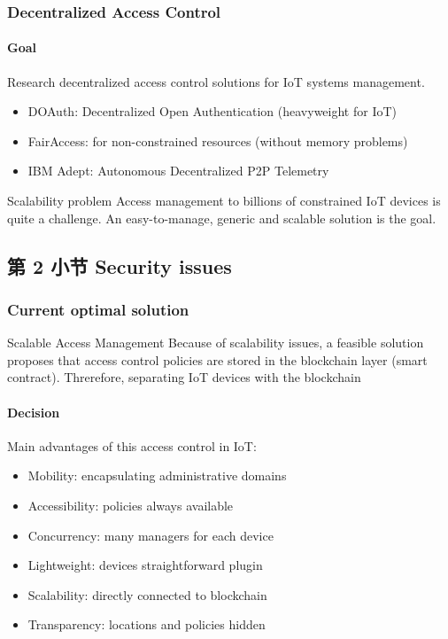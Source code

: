 \documentclass[
    aspectratio=169,                   %
]{beamer}
\begin{document}
    \begin{frame}
        \frametitle{Decentralized Access Control}
        
        \paragraph{Goal} Research decentralized access control solutions for IoT systems management.\cite{ouaddah}

        \begin{itemize}
            \item \alert{DOAuth}: Decentralized Open Authentication (heavyweight for IoT)
            \item \alert{FairAccess}: for non-constrained resources (without memory problems)
            \item \alert{IBM Adept}: Autonomous Decentralized P2P Telemetry
        \end{itemize}

        \begin{block}{Scalability problem}
            Access management to billions of constrained IoT devices is quite a challenge. An easy-to-manage, generic and scalable solution is the goal.
        \end{block}
    \end{frame}

\subsection{第 2 小节 Security issues}

    \begin{frame}
        \frametitle{Current optimal solution}
        
        \begin{block}{Scalable Access Management}
            Because of scalability issues, a feasible solution proposes that access control policies are stored in the blockchain layer (smart contract). Threrefore, separating IoT devices with the blockchain\cite{novo}
        \end{block}

        \paragraph{Decision} Main advantages of this access control in IoT:

        \begin{itemize}
            \item \alert{Mobility}: encapsulating administrative domains
            \item \alert{Accessibility}: policies always available
            \item \alert{Concurrency}: many managers for each device
            \item \alert{Lightweight}: devices straightforward plugin
            \item \alert{Scalability}: directly connected to blockchain
            \item \alert{Transparency}: locations and policies hidden
        \end{itemize}
    \end{frame}
\end{document}

